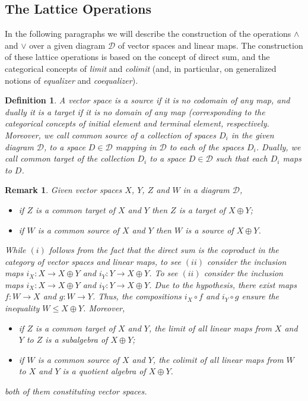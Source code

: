 \documentclass[10pt]{amsart}
\newtheorem{definition}[theorem]{Definition}
\newtheorem{remark}[theorem]{Remark}
\def \DD{{\mathcal D}}
\begin{document}
\subsection{The Lattice Operations}
% 
% 
%
%
In the following paragraphs we will describe the construction of the operations $\wedge $ and $\vee$ over a given diagram $\DD$ of vector spaces and linear maps.
The construction of these lattice operations is based on the concept of direct sum, and the categorical concepts of \emph{limit} and \emph{colimit} (and, in particular, on generalized notions of \emph{equalizer} and \emph{coequalizer}).

\begin{definition}
A vector space is a \emph{source} if it is no codomain of any map, and dually it is a \emph{target} if it is no domain of any map (corresponding to the categorical concepts of \emph{initial element} and \emph{terminal element}, respectively. 
Moreover, we call \emph{common source} of a collection of spaces $D_i$ in the given diagram $\DD$, to a space $D\in \DD$ mapping in $\DD$ to each of the spaces $D_i$.
Dually, we call \emph{common target} of the collection $D_i$ to a space $D\in \DD$ such that each $D_i$ maps to $D$.
\end{definition}

\begin{remark}\label{exist}
Given vector spaces $X$, $Y$, $Z$ and $W$ in a diagram $\DD$,

\begin{itemize}
\item[(i)] if $Z$ is a common target of $X$ and $Y$ then $Z$ is a target of $X\oplus Y$;
\item[(ii)] if $W$ is a common source of $X$ and $Y$ then $W$ is a source of $X\oplus Y$.
\end{itemize}
%
While $(i)$ follows from the fact that the direct sum is the coproduct in the category of vector spaces and linear maps, to see $(ii)$ consider the inclusion maps $i_{X}:X\rightarrow X\oplus Y$ and $i_{Y}:Y\rightarrow X\oplus Y$. To see $(ii)$ consider the inclusion maps $i_{X}:X\rightarrow X\oplus Y$ and $i_{Y}:Y\rightarrow X\oplus Y$.
Due to the hypothesis, there exist maps $f:W\rightarrow X$ and $g:W\rightarrow Y$. Thus, the compositions $i_{X}\circ f$ and $i_{Y}\circ g$ ensure the inequality $W\leq X\oplus Y$.  
%
Moreover, 
\begin{itemize}
\item[(iii)] if $Z$ is a common target of $X$ and $Y$, the limit of all linear maps from $X$ and $Y$ to $Z$ is a subalgebra of $X\oplus Y$;
\item[(iv)] if $W$ is a common source of $X$ and $Y$, the colimit of all linear maps from $W$ to $X$ and $Y$ is a quotient algebra of $X\oplus Y$.
\end{itemize}
both of them constituting vector spaces. 
%
\end{remark}
\end{document}
